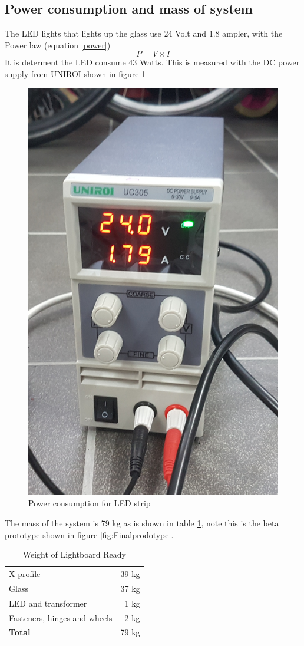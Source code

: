 \documentclass[a4paper]{jpconf}
\begin{document}
\subsection{Power consumption and mass of system }
The LED lights that lights up the glass use 24 Volt and 1.8 ampler, with the Power law (equation \ref{power})
\begin{equation}\label{power}
P = V \times I
\end{equation}
It is determent the LED consume 43 Watts.
This is measured with the DC power supply from UNIROI shown in figure \ref{fig:powercons}
\begin{figure}
	\centering
	\includegraphics[width=0.7\linewidth]{graphicsFromGardabae/Powerconsum.jpg}
	\caption{Power consumption for LED strip}
	\label{fig:powercons}
\end{figure}

The mass of the system is 79 kg as is shown in table \ref{weight}, note this is the beta prototype shown in figure \ref{fig:Finalprodotype}.
\begin{table}[]
	\begin{tabular}{lr}
		X-profile \cite{8020}& 39 kg \\
		Glass \cite{ispan} & 37 kg \\
		LED and transformer & 1 kg \\
		Fasteners, hinges and wheels & 2 kg \\ \hline
		\textbf{Total}& 79 kg
	\end{tabular}
	\caption{Weight of Lightboard Ready}
	\label{weight}
\end{table}
\end{document}
